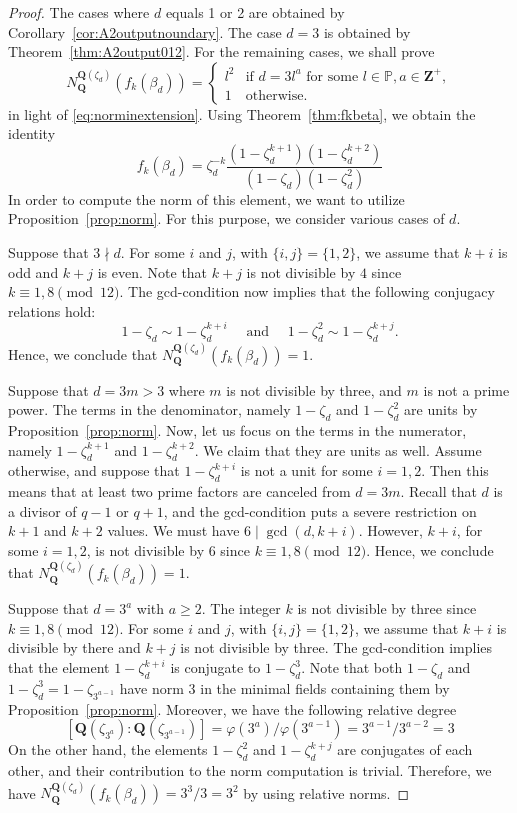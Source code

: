 \documentclass{amsart}
\newcommand{\Q}{\mathbf Q}
\newcommand{\Z}{\mathbf Z}
\newcommand{\cycl}[1]{\Q(\zeta_{#1})}
\numberwithin{equation}{section}
\theoremstyle{plain}
\theoremstyle{definition}
\begin{document}
\begin{proof}
The cases where $d$ equals 1 or 2 are obtained by Corollary~\ref{cor:A2outputnoundary}. The case $d=3$ is obtained by Theorem~\ref{thm:A2output012}. For the remaining cases, we shall prove
\[N_{\Q}^{\Q(\zeta_d)}\left(f_k(\beta_d)\right) = 
	\begin{cases} 
		l^2 & \text{if } d = 3l^a \text{ for some }l\in\mathbb{P}, a\in\Z^{+},\\
		1 & \text{otherwise}.
	\end{cases}
	\]
in light of \eqref{eq:norminextension}. Using Theorem~\ref{thm:fkbeta}, we obtain the identity 
$$f_k(\beta_d)=\zeta_d^{-k}\dfrac{\left(1-\zeta_d^{k+1}\right)\left(1-\zeta_d^{k+2}\right)}{\left(1-\zeta_d\right)\left(1-\zeta_d^2\right)}$$
In order to compute the norm of this element, we want to utilize Proposition~\ref{prop:norm}. For this purpose, we consider various cases of $d$.

Suppose that $3\nmid d$. For some $i$ and $j$, with $\{i,j\}=\{1,2\}$, we assume that $k+i$ is odd and $k+j$ is even. Note that $k+j$ is not divisible by $4$ since $k\equiv1,8\pmod{12}$. The gcd-condition now implies that the following conjugacy relations hold: $$1-\zeta_d \sim 1-\zeta_d^{k+i}\quad \text{ and }\quad 1-\zeta_d^2 \sim 1-\zeta_d^{k+j}.$$ 
Hence, we conclude that $N_{\Q}^{\Q(\zeta_d)}\left(f_k(\beta_d)\right)=1$.

Suppose that $d=3m>3$ where $m$ is not divisible by three, and $m$ is not a prime power. The terms in the denominator, namely $1-\zeta_d$ and $1-\zeta_d^2$ are units by Proposition~\ref{prop:norm}. Now, let us focus on the terms in the numerator, namely $1-\zeta_d^{k+1}$ and $1-\zeta_d^{k+2}$. We claim that they are units as well. Assume otherwise, and suppose that  $1-\zeta_d^{k+i}$ is not a unit for some $i=1,2$. Then this means that at least two prime factors are canceled from $d=3m$. Recall that $d$ is a divisor of $q-1$ or $q+1$, and the gcd-condition puts a severe restriction on $k+1$ and $k+2$ values. We must have $6 \mid \gcd(d,k+i)$. However, $k+i$, for some $i=1,2$, is not divisible by $6$ since $k\equiv1,8\pmod{12}$. Hence, we conclude that $N_{\Q}^{\Q(\zeta_d)}\left(f_k(\beta_d)\right)=1$.

Suppose that $d=3^a$ with $a \ge 2$. The integer $k$ is not divisible by three since  $k\equiv1,8\pmod{12}$. For some $i$ and $j$, with $\{i,j\}=\{1,2\}$, we assume that $k+i$ is divisible by there and $k+j$ is not divisible by three. The gcd-condition implies that the element $1-\zeta_d^{k+i}$ is conjugate to $1-\zeta_d^3$. Note that both $1-\zeta_d$ and $1-\zeta_d^3 = 1-\zeta_{3^{a-1}}$ have norm $3$ in the minimal fields containing them by Proposition~\ref{prop:norm}. Moreover, we have the following relative degree
$$[\cycl{3^a}:\cycl{3^{a-1}}] = \varphi(3^a)/\varphi(3^{a-1}) = 3^{a-1}/3^{a-2} = 3$$
On the other hand, the elements
$1-\zeta_d^2$ and $1-\zeta_d^{k+j}$ are conjugates of each other, and their contribution to the norm computation is trivial. Therefore, we have $N_{\Q}^{\Q(\zeta_d)}\left(f_k(\beta_d)\right) = 3^3/3 = 3^2$ by using relative norms.


\end{proof}
\end{document}
